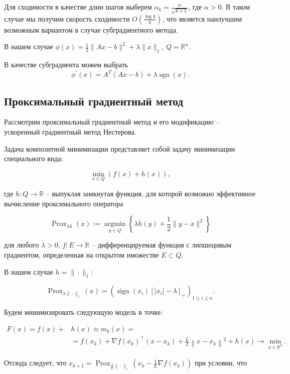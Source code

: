 \documentclass[11pt]{article}
\DeclareMathOperator{\sgn}{sgn}
\begin{document}
Для сходимости в качестве длин шагов выберем $\alpha_{k}=\frac{\alpha}{\sqrt{k+1}}$, где $\alpha > 0$. В таком случае мы получим скорость сходимости $O \left(\frac{\log k}{k} \right)$, что является наилучшим возможным вариантом в случае субградиентного метода.

В нашем случае $\phi(x) =  \frac{1}{2}\|A x-b\|^{2}+\lambda\|x\|_{1}$, $Q = \mathbb{R}^n$.

В качестве субградиента можем выбрать 
$$\phi^\prime(x) = A^T (Ax - b) + \lambda \sgn(x).$$

\subsection{Проксимальный градиентный метод}

Рассмотрим проксимальный градиентный метод и его модификацию -- ускоренный градиентный метод Нестерова.


Задача композитной минимизации представляет собой задачу минимизации специального вида:

$$
\min _{x \in Q} \left( f(x)+h(x) \right),
$$

где $h: Q \rightarrow \mathbb{R}$ -- выпуклая замкнутая функция, для которой возможно эффективное вычисление проксимального оператора

$$\operatorname{Prox}_{\lambda h}(x):=\underset{y \in Q}{\operatorname{argmin}}\left\{\lambda h(y)+\frac{1}{2}\|y-x\|^{2}\right\}$$

для любого $\lambda > 0$, $f:E \rightarrow \mathbb{R}$ -- дифференцируемая функция с липшецивым градиентом, определенная на открытом нможестве $E \subset Q$.

В нашем случае $h = \| \cdot \|_1$:

$$
\operatorname{Prox}_{\lambda\|\cdot\|_{1}}(x)=\left(\operatorname{sign}\left(x_{i}\right)\left[\left|x_{i}\right|-\lambda\right]_{+}\right)_{1 \leq i \leq n}.
$$

Будем минимизировать следующую модель в точке:

\begin{equation*}
\begin{split}
F(x) = f(x) + & h(x) \approx m_{k}(x) = \\ &= f\left(x_{k}\right)+\nabla f\left(x_{k}\right)^{\top}\left(x-x_{k}\right)+\frac{L}{2}\left\|x-x_{k}\right\|^{2}+h(x) \rightarrow \min_{x \in \mathbb{R}^n}.
\end{split}
\end{equation*}

Отсюда следует, что $x_{k+1} = \operatorname{Prox}_{\frac{\lambda}{L}\|\cdot\|_{1}}(x_k - \frac{1}{L} \nabla f(x_k))$ при условии, что 
\end{document}
